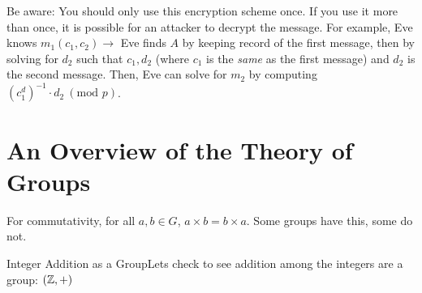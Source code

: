 \begin{note}
    Be aware: You should only use this encryption scheme once. If you use it more than once, it is possible for an attacker to decrypt the message. For example, Eve knows \(m_1(c_1, c_2) \rightarrow\) Eve finds \(A\) by keeping record of the first message, then by solving for \(d_2\) such that \(c_1, d_2\) (where \(c_1\) is the \textit{same} as the first message) and \(d_2\) is the second message. Then, Eve can solve for \(m_2\) by computing \({(c_1^d)}^{-1} \cdot d_2 \ (\text{mod } p)\).
\end{note}







\hypertarget{sec:2.5 groups}{}
\section{An Overview of the Theory of Groups}


For commutativity, for all \(a,b \in G\), \(a\times b = b \times a\). Some groups have this, some do not. \\

\begin{example}
    {Integer Addition as a Group}Lets check to see addition among the integers are a group: \((\mathbb{Z}, +)\)
\end{example}


